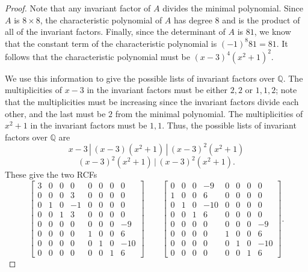 \documentclass[11pt]{article}
\newcommand{\Q}{\mathbb{Q}}
\theoremstyle{definition}
\begin{document}
\begin{proof}
Note that any invariant factor of $A$ divides the minimal polynomial. Since $A$ is $8 \times 8$, the characteristic polynomial of $A$ has degree $8$ and is the product of all of the invariant factors. Finally, since the determinant of $A$ is $81$, we know that the constant term of the characteristic polynomial is $(-1)^8 81 = 81$. It follows that the characteristic polynomial must be $(x-3)^4 (x^2+1)^2$.

We use this information to give the possible lists of invariant factors over $\Q$. The multiplicities of $x-3$ in the invariant factors must be either $2,2$ or $1,1,2$; note that the multiplicities must be increasing since the invariant factors divide each other, and the last must be $2$ from the minimal polynomial. The multiplicities of $x^2+1$ in the invariant factors must be $1,1$. Thus, the possible lists of invariant factors over $\Q$ are 
\[ x-3 \, | \, (x-3)(x^2+1) \, | \, (x-3)^2(x^2 + 1)\]
\[  (x-3)^2(x^2+1) \, | \, (x-3)^2(x^2 + 1).\]
These give the two RCFs
\[ \begin{bmatrix} 
3 & 0 & 0 & 0 & 0 & 0 & 0 & 0  \\
 0 & 0 & 0 & 3 & 0 & 0 & 0 & 0  \\ 
  0 & 1 & 0 & -1 & 0 & 0 & 0 & 0  \\ 
   0 & 0 & 1 & 3 & 0 & 0 & 0 & 0  \\ 
    0 & 0 & 0 & 0 & 0 & 0 & 0 & -9  \\ 
     0 & 0 & 0 & 0 & 1 & 0 & 0 & 6  \\ 
      0 & 0 & 0 & 0 & 0 & 1 & 0 & -10  \\ 
       0 & 0 & 0 & 0 & 0 & 0 & 1 & 6  
       \end{bmatrix} \qquad 
       \begin{bmatrix} 
0 & 0 & 0 & -9 & 0 & 0 & 0 & 0  \\
 1 & 0 & 0 & 6 & 0 & 0 & 0 & 0  \\ 
  0 & 1 & 0 & -10 & 0 & 0 & 0 & 0  \\ 
   0 & 0 & 1 & 6 & 0 & 0 & 0 & 0  \\ 
    0 & 0 & 0 & 0 & 0 & 0 & 0 & -9  \\ 
     0 & 0 & 0 & 0 & 1 & 0 & 0 & 6  \\ 
      0 & 0 & 0 & 0 & 0 & 1 & 0 & -10  \\ 
       0 & 0 & 0 & 0 & 0 & 0 & 1 & 6  
       \end{bmatrix}.\]
      

\end{proof}
\end{document}
